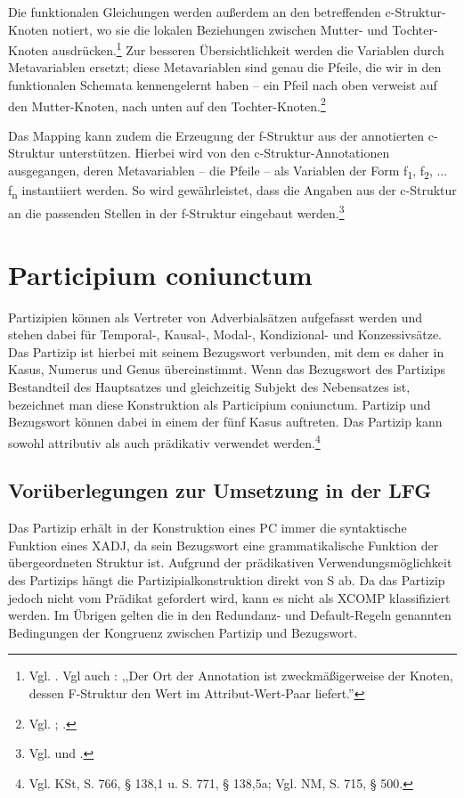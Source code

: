 \documentclass[12pt,a4paper]{article}
\begin{document}
Die funktionalen Gleichungen werden außerdem an den betreffenden c-Struktur-Knoten notiert, wo sie die lokalen Beziehungen zwischen Mutter- und Tochter-Knoten ausdrücken.\footnote{Vgl. \cite[69]{Falk}. Vgl auch \cite[12]{Skript}: ,,Der Ort der Annotation ist zweckmäßigerweise der Knoten, dessen F-Struktur den Wert im Attribut-Wert-Paar liefert.''} Zur besseren Übersichtlichkeit werden die Variablen durch Metavariablen ersetzt; diese Metavariablen sind genau die Pfeile, die wir in den funktionalen Schemata kennengelernt haben -- ein Pfeil nach oben verweist auf den Mutter-Knoten, nach unten auf den Tochter-Knoten.\footnote{Vgl. \cite[69]{Falk}; \cite[15-6]{Skript}.}


Das Mapping kann zudem die Erzeugung der f-Struktur aus der annotierten c-Struktur unterstützen. Hierbei wird von den c-Struktur-Annotationen ausgegangen, deren Metavariablen -- die Pfeile -- als Variablen der Form f\textsubscript{1}, f\textsubscript{2}, ... f\textsubscript{n} instantiiert werden. So wird gewährleistet, dass die Angaben aus der c-Struktur an die passenden Stellen in der f-Struktur eingebaut werden.\footnote{Vgl. \cite[34]{Rohrer} und \cite[8; 10-11; 14; 17; 19; 28; 54]{Skript}.} 

\section{Participium coniunctum}
Partizipien können als Vertreter von Adverbialsätzen aufgefasst werden und stehen dabei für Temporal-, Kausal-, Modal-, Kondizional- und Konzessivsätze. Das Partizip ist hierbei mit seinem Bezugswort verbunden, mit dem es daher in Kasus, Numerus und Genus übereinstimmt. Wenn das Bezugswort des Partizips Bestandteil des Hauptsatzes und gleichzeitig Subjekt des Nebensatzes ist, bezeichnet man diese Konstruktion als Participium coniunctum. Partizip und Bezugswort können dabei in einem der fünf Kasus  auftreten. Das Partizip kann sowohl attributiv als auch prädikativ verwendet werden.\footnote{Vgl. KSt, S. 766, § 138,1 u. S. 771, § 138,5a; Vgl. NM, S. 715, § 500.} \\

\subsection{Vorüberlegungen zur Umsetzung in der LFG}
Das Partizip erhält in der Konstruktion eines PC immer die syntaktische Funktion eines XADJ, da sein Bezugswort eine grammatikalische Funktion der übergeordneten Struktur ist. Aufgrund der prädikativen Verwendungsmöglichkeit des Partizips hängt die Partizipialkonstruktion direkt von S ab. Da das Partizip jedoch nicht vom Prädikat gefordert wird, kann es nicht als XCOMP klassifiziert werden.
Im Übrigen gelten die in den Redundanz- und Default-Regeln genannten Bedingungen der Kongruenz zwischen Partizip und Bezugswort.
\end{document}
